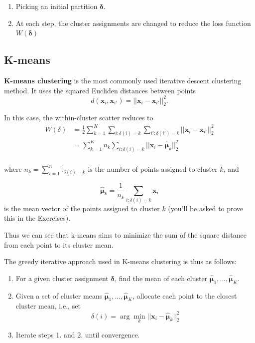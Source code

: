 \documentclass[
]{book}
\providecommand{\tightlist}{%
  \setlength{\itemsep}{0pt}\setlength{\parskip}{0pt}}
\theoremstyle{definition}
\theoremstyle{definition}
\theoremstyle{definition}
\theoremstyle{definition}
\theoremstyle{remark}
\begin{document}
\begin{enumerate}
\def\labelenumi{\arabic{enumi}.}
\tightlist
\item
  Picking an initial partition \(\boldsymbol \delta\).
\item
  At each step, the cluster assignments are changed to reduce the loss function \(W(\boldsymbol \delta)\)
\end{enumerate}

\hypertarget{k-means}{%
\subsection{K-means}\label{k-means}}

\textbf{K-means clustering} is the most commonly used iterative descent clustering method. It uses the squared Eucliden distances between points
\[d(\mathbf x_i, \mathbf x_{i'})=||\mathbf x_i - \mathbf x_{i'}||_2^2.\]

In this case, the within-cluster scatter reduces to
\begin{align}
W(\delta) &= \frac{1}{2}\sum_{k=1}^K \sum_{i: \delta(i)=k} \sum_{i': \delta(i')=k} ||\mathbf x_i - \mathbf x_{i'}||_2^2 \\
&= \sum_{k=1}^K n_k \sum_{i: \delta(i)=k} ||\mathbf x_{i} - \hat{{\boldsymbol{\mu}}}_k||_2^2 \label{eq:Wscatterk}\\
\end{align}

where \(n_k = \sum_{i=1}^n \mathbb{I}_{\delta(i)=k}\) is the number of points assigned to cluster \(k\), and

\[\hat{{\boldsymbol{\mu}}}_k=\frac{1}{n_k}\sum_{i: \delta(i)=k} \mathbf x_i\]
is the mean vector of the points assigned to cluster \(k\) (you'll be asked to prove this in the Exercises).

Thus we can see that k-means aims to minimize the sum of the square distance from each point to its cluster mean.

The greedy iterative approach used in K-means clustering is thus as follows:

\begin{enumerate}
\def\labelenumi{\arabic{enumi}.}
\item
  For a given cluster assignment \(\boldsymbol \delta\), find the mean of each cluster \(\hat{{\boldsymbol{\mu}}}_1, \ldots, \hat{{\boldsymbol{\mu}}}_K\).
\item
  Given a set of cluster means \(\hat{{\boldsymbol{\mu}}}_1, \ldots, \hat{{\boldsymbol{\mu}}}_K\), allocate each point to the closest cluster mean, i.e., set
  \[\delta(i) = \arg \min_k ||\mathbf x_i - \hat{{\boldsymbol{\mu}}}_k||_2^2\]
\item
  Iterate steps 1. and 2. until convergence.
\end{enumerate}
\end{document}

